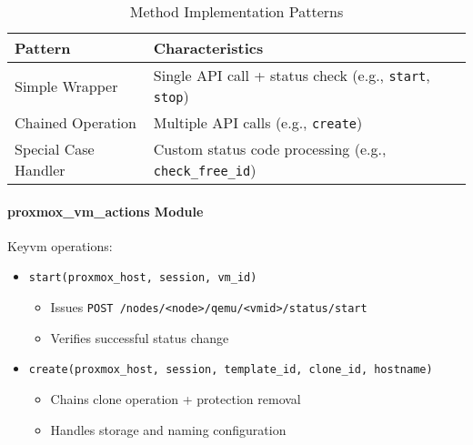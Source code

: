                 \begin{table}[h]
                \centering
                \caption{Method Implementation Patterns}
                \label{tab:method-patterns}
                \begin{tabular}{lp{8cm}}
                \toprule
                \textbf{Pattern} & \textbf{Characteristics} \\
                \midrule
                Simple Wrapper & Single API call + status check (e.g., \texttt{start}, \texttt{stop}) \\
                Chained Operation & Multiple API calls (e.g., \texttt{create}) \\
                Special Case Handler & Custom status code processing (e.g., \texttt{check\_free\_id}) \\
                \bottomrule
                \end{tabular}
                \end{table}
                
            \paragraph{proxmox\_vm\_actions Module}
                Key\ac{vm} operations:
                
                \begin{itemize}
                    \item \texttt{start(proxmox\_host, session, vm\_id)}
                    \begin{itemize}
                        \item Issues \texttt{POST /nodes/<node>/qemu/<vmid>/status/start}
                        \item Verifies successful status change
                    \end{itemize}
                    
                    \item \texttt{create(proxmox\_host, session, template\_id, clone\_id, hostname)}
                \begin{itemize}
                    \item Chains clone operation + protection removal
                    \item Handles storage and naming configuration
                    \end{itemize}
                \end{itemize}

